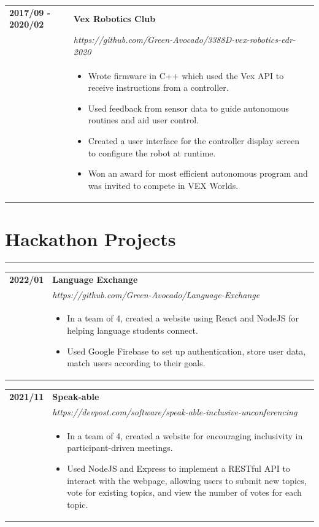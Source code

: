 \documentclass[letterpaper]{article}
\newcommand{\sectcolor}{cyan}
\newcommand{\sect}[1]{\section*{#1}
                        {\color{\sectcolor}
                        \rule{\textwidth}{1pt}
                        \vspace{-7pt}}}
\begin{document}
        \begin{tabular}{p{} p{}}
            \textbf{2017/09 - 2020/02} & \textbf{Vex Robotics Club} \\
            & \emph{https://github.com/Green-Avocado/3388D-vex-robotics-edr-2020} \\
            & \begin{itemize}
                \item Wrote firmware in C++ which used the Vex API to receive instructions from a
                    controller.
                \item Used feedback from sensor data to guide autonomous routines and aid user control.
                \item Created a user interface for the controller display screen to configure the robot at
                    runtime.
                \item Won an award for most efficient autonomous program and was invited to compete in VEX
                    Worlds.
            \end{itemize}
        \end{tabular}

    \sect{Hackathon Projects}

        \begin{tabular}{p{} p{}}
            \textbf{2022/01} & \textbf{Language Exchange} \\
            & \emph{https://github.com/Green-Avocado/Language-Exchange} \\
            & \begin{itemize}
                \item In a team of 4, created a website using React and NodeJS for helping language
                    students connect.
                \item Used Google Firebase to set up authentication, store user data, match users
                    according to their goals.
            \end{itemize}
        \end{tabular}

        \begin{tabular}{p{} p{}}
            \textbf{2021/11} & \textbf{Speak-able} \\
            & \emph{https://devpost.com/software/speak-able-inclusive-unconferencing} \\
            & \begin{itemize}
                \item In a team of 4, created a website for encouraging inclusivity in
                    participant-driven meetings.
                \item Used NodeJS and Express to implement a RESTful API to interact with the webpage,
                    allowing users to submit new topics, vote for existing topics, and view the number
                    of votes for each topic.
            \end{itemize}
        \end{tabular}
\end{document}

